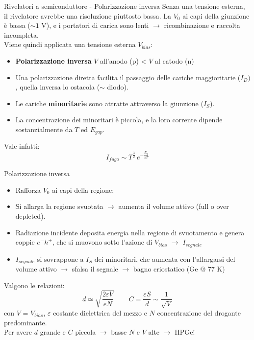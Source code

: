\documentclass{beamer}
\begin{document}
\begin{frame}{Rivelatori a semiconduttore - Polarizzazione inversa}
    Senza una tensione esterna, il rivelatore avrebbe una risoluzione piuttosto bassa.  La $V_0$ ai capi della giunzione è bassa ($\sim 1$ V), e i portatori di carica sono lenti $\to$ ricombinazione e raccolta incompleta. 
    \\ Viene quindi applicata una tensione esterna $V_{bias}$:
    \begin{itemize}
        \item \textbf{Polarizzazione inversa} $V$ all'anodo (p) < $V$ al catodo (n)
        \item Una polarizzazione diretta facilita il passaggio delle cariche maggioritarie ($I_D)$, quella inversa lo ostacola ($\sim$ diodo).
        \item Le cariche \textbf{minoritarie} sono attratte attraverso la giunzione ($I_S$).
        \item La concentrazione dei minoritari è piccola, e la loro corrente dipende sostanzialmente da $T$ ed $E_{gap}$.
    \end{itemize}
    \medskip
    Vale infatti:
    \begin{equation*}
        I_{fuga} \sim T^{\frac{3}{2}}\,e^{-\frac{E_g}{kT}}
    \end{equation*}
\end{frame}

\begin{frame}{Polarizzazione inversa}
\begin{itemize}
    \item Rafforza $V_0$ ai capi della regione;
    \item Si allarga la regione svuotata $\to$ aumenta il volume attivo (full o over depleted).
    \item Radiazione incidente deposita energia nella regione di svuotamento e genera coppie $e^-h^+$, che si muovono sotto l'azione di $V_{bias}$ $\to$ $I_{segnale}$
    \item $I_{segnale}$ si sovrappone a $I_S$ dei minoritari, che aumenta con l'allargarsi del volume attivo $\to$ sfalsa il segnale $\to$ bagno criostatico (Ge @ 77 K) 
\end{itemize}
    Valgono le relazioni:
    \begin{equation*}
        d \simeq \sqrt{\frac{2\varepsilon V}{eN}} \,\,\,\,\,\,\,\,\,\,\,\,\,C = \frac{\varepsilon S}{d} \sim \frac{1}{\sqrt{V}}
    \end{equation*}
    con $V$ = $V_{bias}$, $\varepsilon$ costante dielettrica del mezzo e $N$ concentrazione del drogante predominante.
    \\ Per avere $d$ grande e $C$ piccola $\to$ basse $N$ e $V$ alte $\to$ HPGe!
\end{frame}
\end{document}
